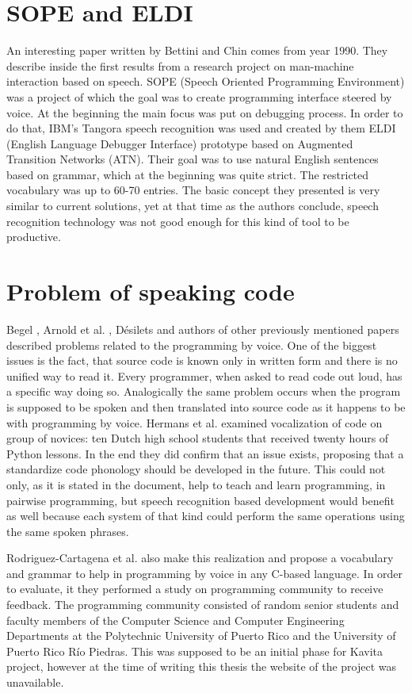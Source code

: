 \section{SOPE and ELDI}
An interesting paper written by Bettini and Chin \cite{Bettini1990} comes from year 1990. They describe inside the first results from a research project on man-machine interaction based on speech. SOPE (Speech Oriented Programming Environment) was a project of which the goal was to create programming interface steered by voice. At the beginning the main focus was put on debugging process. In order to do that, IBM's Tangora speech recognition was used and created by them ELDI (English Language Debugger Interface) prototype based on Augmented Transition Networks (ATN). Their goal was to use natural English sentences based on grammar, which at the beginning was quite strict. The restricted vocabulary was up to 60-70 entries. The basic concept they presented is very similar to current solutions, yet at that time as the authors conclude, speech recognition technology was not good enough for this kind of tool to be productive.

\section{Problem of speaking code}

Begel \cite{Begel2005}, Arnold et al. \cite{Arnold2000} , Désilets \cite{Desilets2001} and authors of other previously mentioned papers described problems related to the programming by voice. One of the biggest issues is the fact, that source code is known only in written form and there is no unified way to read it. Every programmer, when asked to read code out loud, has a specific way doing so. Analogically the same problem occurs when the program is supposed to be spoken and then translated into source code as it happens to be with programming by voice. Hermans et al. \cite{Hermans2018} examined vocalization of code on group of novices: ten Dutch high school students that received twenty hours of Python lessons. In the end they did confirm that an issue exists, proposing that a standardize code phonology should be developed in the future. This could not only, as it is stated in the document, help to teach and learn programming, in pairwise programming, but speech recognition based development would benefit as well because each system of that kind could perform the same operations using the same spoken phrases. 

Rodriguez-Cartagena et al. \cite{Rodriguez-Cartagena2015} also make this realization and propose a vocabulary and grammar to help in programming by voice in any C-based language. In order to evaluate, it they performed a study on programming community to receive feedback. 
The programming community consisted of random senior students and faculty members of the Computer Science and Computer Engineering Departments at the Polytechnic University of Puerto Rico and the University of Puerto Rico Río Piedras. This was supposed to be an initial phase for Kavita project, however at the time of writing this thesis the website of the project was unavailable.

